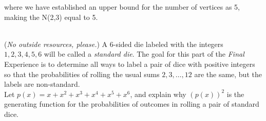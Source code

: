 \documentclass{article}
\begin{document}
{\begin{center}
\end{center}
	where we have established an upper bound for the number of vertices as 5, making the N(2,3) equal to 5.
} 
\vspace{2em}
\noindent \underline{\hspace{5in}}
\newpage
\vspace{2em}
\\
\noindent(\emph{No outside resources, please.}) A 6-sided die labeled with the integers $1, 2, 3, 4, 5, 6$ will be called a \emph{standard die}.  The goal for this part of the \emph{Final} Experience is to determine all ways to label a pair of dice with positive integers so that the probabilities of rolling the usual sums $2, 3, \dots ,12$ are the same, but the labels are non-standard.  \\
  Let $p(x) = x+x^2+x^3+x^4+x^5+x^6$, and explain why $(p(x))^2$ is the generating function for the probabilities of outcomes in rolling a pair of standard dice.
\end{document}
